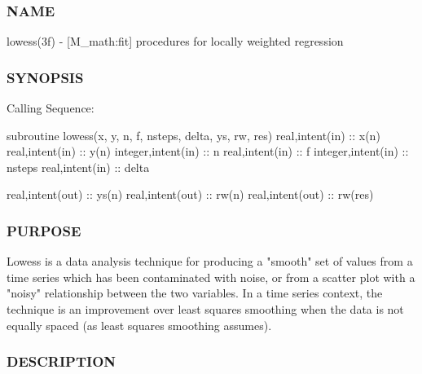 \subsubsection*{N\+A\+ME}

lowess(3f) -\/ \mbox{[}M\+\_\+math\+:fit\mbox{]} procedures for locally weighted regression 

\subsubsection*{S\+Y\+N\+O\+P\+S\+IS}

\begin{DoxyVerb}Calling Sequence:

 subroutine lowess(x, y, n, f, nsteps, delta, ys, rw, res)
 real,intent(in)    :: x(n)
 real,intent(in)    :: y(n)
 integer,intent(in) :: n
 real,intent(in)    :: f
 integer,intent(in) :: nsteps
 real,intent(in)    :: delta

 real,intent(out)   :: ys(n)
 real,intent(out)   :: rw(n)
 real,intent(out)   :: rw(res)
\end{DoxyVerb}


\subsubsection*{P\+U\+R\+P\+O\+SE}

\begin{DoxyVerb}Lowess is a data analysis technique for producing a "smooth" set of
values from a time series which has been contaminated with noise,
or from a scatter plot with a "noisy" relationship between the two
variables. In a time series context, the technique is an improvement
over least squares smoothing when the data is not equally spaced
(as least squares smoothing assumes).
\end{DoxyVerb}


\subsubsection*{D\+E\+S\+C\+R\+I\+P\+T\+I\+ON}

